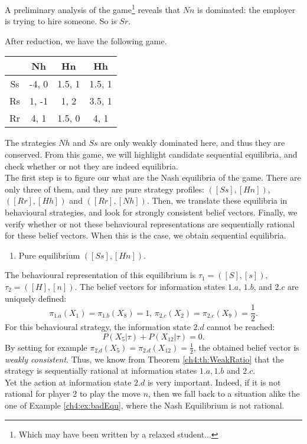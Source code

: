 \begin{example}
A preliminary analysis of the game\footnote{Which may have been written by a relaxed student...} reveals that $Nn$ is dominated: the employer is trying to hire someone. So is $Sr$. 


After reduction, we have the following game.
\begin{center}
\begin{tabular}{c|ccc}
  & Nh  & Hn & Hh \\
\hline
Ss  & -4, 0 & 1.5, 1 & 1.5, 1 \\
Rs  &  1, -1 & 1, 2& 3.5, 1 \\
Rr  &  4, 1  & 1.5, 0 & 4, 1 \\
\end{tabular}
\end{center}
 The strategies $Nh$ and $Ss$ are only weakly dominated here, and thus they are conserved. From this game, we will highlight candidate sequential equilibria, and check whether or not they are indeed equilibria.\\
  The first step is to figure our what are the Nash equilibria of the game. There are only three of them, and they are pure strategy profiles: $([Ss], [Hn])$,  $([Rr], [Hh])$ and $([Rr] , [Nh])$.
Then, we translate these equilibria in behavioural strategies, and look for strongly consistent belief vectors. Finally, we verify whether or not these behavioural representations are sequentially rational for these belief vectors. When this is the case, we obtain sequential equilibria.
\begin{enumerate}
\item Pure equilibrium $([Ss], [Hn])$. 
\end{enumerate}
The behavioural representation of this equilibrium is $\tau_1 = ([S],[s])$, $\tau_2 = ([H],[n])$.
The belief vectors for information states $1.a$, $1.b$, and $2.c$ are uniquely defined: 
$$
\pi_{1.a}(X_1) = \pi_{1.b}(X_8) =1, \,  \pi_{2.c}(X_2) = \pi_{2.c}(X_9) = \frac{1}{2}.
$$
For this behavioural strategy, the information state $2.d$ cannot be reached: 
$$P(X_5 | \tau) + P(X_{12} | \tau) = 0. $$
By setting for example $\pi_{2.d}(X_5) = \pi_{2.d}(X_{12}) = \frac{1}{2}$, the obtained belief vector is \emph{weakly consistent}. Thus, we know from Theorem \ref{ch4:th:WeakRatio} that the strategy is sequentially rational at information states $1.a, 1.b$ and $2.c$.\\
Yet the action at information state $2.d$ is very important. Indeed, if it is not rational for player 2 to play the move $n$, then we fall back to a situation alike the one of Example \ref{ch4:ex:badEqu}, where the Nash Equilibrium is not rational.\\

\end{example}
